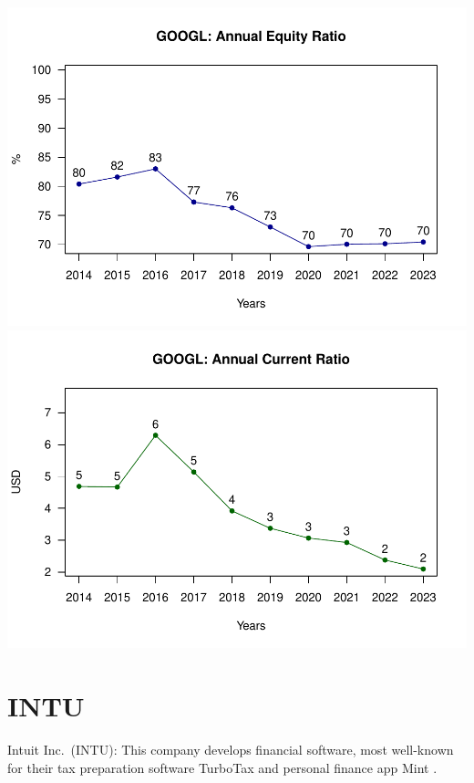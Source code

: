 \documentclass[
]{book}
\begin{document}
\includegraphics{_main_files/figure-latex/unnamed-chunk-1-24.pdf}
\includegraphics{_main_files/figure-latex/unnamed-chunk-1-25.pdf}

\hypertarget{intu}{%
\section{INTU}\label{intu}}

Intuit Inc.~(INTU): This company develops financial software, most well-known for their tax preparation software TurboTax and personal finance app Mint .
\end{document}
